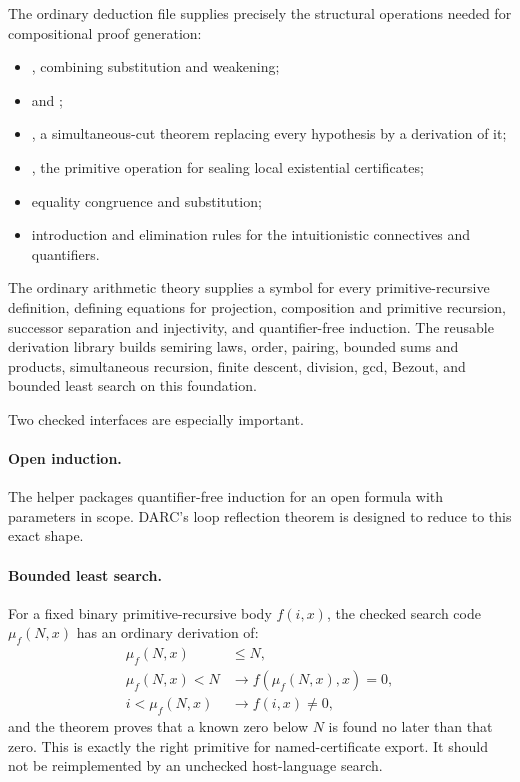 The ordinary deduction file supplies precisely the structural operations
needed for compositional proof generation:
\begin{itemize}
  \item {}, combining substitution and weakening;
  \item {} and ;
  \item {}, a simultaneous-cut theorem replacing every
        hypothesis by a derivation of it;
  \item {}, the primitive operation for sealing local existential
        certificates;
  \item equality congruence and substitution;
  \item introduction and elimination rules for the intuitionistic
        connectives and quantifiers.
\end{itemize}
The ordinary arithmetic theory supplies a symbol for every primitive-recursive
definition, defining equations for projection, composition and primitive
recursion, successor separation and injectivity, and quantifier-free
induction.  The reusable derivation library builds semiring laws, order,
pairing, bounded sums and products, simultaneous recursion, finite descent,
division, gcd, Bezout, and bounded least search on this foundation.

Two checked interfaces are especially important.

\paragraph{Open induction.}
The helper  packages quantifier-free induction for an open
formula with parameters in scope.  DARC's loop reflection theorem is designed
to reduce to this exact shape.

\paragraph{Bounded least search.}
For a fixed binary primitive-recursive body \(f(i,x)\), the checked search code
\(\mu_f(N,x)\) has an ordinary derivation of:
\begin{align*}
  \mu_f(N,x)&\le N,\\
  \mu_f(N,x)<N&\to f(\mu_f(N,x),x)=0,\\
  i<\mu_f(N,x)&\to f(i,x)\ne 0,
\end{align*}
and the theorem  proves that a known zero below \(N\)
is found no later than that zero.  This is exactly the right primitive for
named-certificate export.  It should not be reimplemented by an unchecked
host-language search.

